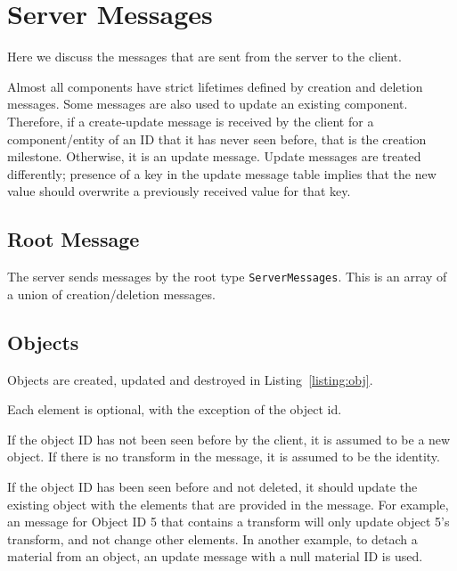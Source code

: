 \documentclass[11pt, oneside]{amsart}
\begin{document}
\section{Server Messages}
\label{sec:server_message}

Here we discuss the messages that are sent from the server to the client.

Almost all components have strict lifetimes defined by creation and deletion messages. Some messages are also used to update an existing component. Therefore, if a create-update message is received by the client for a component/entity of an ID that it has never seen before, that is the creation milestone. Otherwise, it is an update message. Update messages are treated differently; presence of a key in the update message table implies that the new value should overwrite a previously received value for that key.

\subsection{Root Message}

The server sends messages by the root type \texttt{ServerMessages}. This is an array of a union of creation/deletion messages.



\subsection{Objects}

Objects are created, updated and destroyed in Listing~\ref{listing:obj}.



Each element is optional, with the exception of the object id.

If the object ID has not been seen before by the client, it is assumed to be a new object. If there is no transform in the message, it is assumed to be the identity.

If the object ID has been seen before and not deleted, it should update the existing object with the elements that are provided in the message. For example, an message for Object ID 5 that contains a transform will only update object 5's transform, and not change other elements. In another example, to detach a material from an object, an update message with a null material ID is used.
\end{document}
